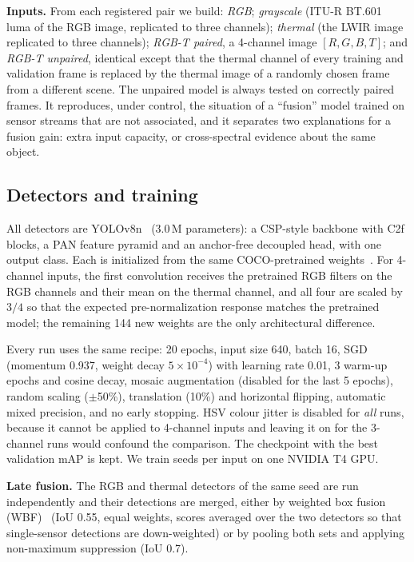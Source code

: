 \documentclass[conference]{IEEEtran}
\begin{document}
\textbf{Inputs.} From each registered pair we build: \emph{RGB}; \emph{grayscale} (ITU-R BT.601 luma of the RGB image, replicated to three channels); \emph{thermal} (the LWIR image replicated to three channels); \emph{RGB-T paired}, a 4-channel image $[R,G,B,T]$; and \emph{RGB-T unpaired}, identical except that the thermal channel of every training and validation frame is replaced by the thermal image of a randomly chosen frame from a different scene. The unpaired model is always tested on correctly paired frames. It reproduces, under control, the situation of a ``fusion'' model trained on sensor streams that are not associated, and it separates two explanations for a fusion gain: extra input capacity, or cross-spectral evidence about the same object.

\subsection{Detectors and training}
All detectors are YOLOv8n~\cite{jocher2023yolov8} (3.0\,M parameters): a CSP-style backbone with C2f blocks, a PAN feature pyramid and an anchor-free decoupled head, with one output class. Each is initialized from the same COCO-pretrained weights~\cite{lin2014coco}. For 4-channel inputs, the first convolution receives the pretrained RGB filters on the RGB channels and their mean on the thermal channel, and all four are scaled by $3/4$ so that the expected pre-normalization response matches the pretrained model; the remaining 144 new weights are the only architectural difference.

Every run uses the same recipe: 20 epochs, input size 640, batch 16, SGD (momentum 0.937, weight decay $5\times10^{-4}$) with learning rate 0.01, 3 warm-up epochs and cosine decay, mosaic augmentation (disabled for the last 5 epochs), random scaling ($\pm$50\%), translation (10\%) and horizontal flipping, automatic mixed precision, and no early stopping. HSV colour jitter is disabled for \emph{all} runs, because it cannot be applied to 4-channel inputs and leaving it on for the 3-channel runs would confound the comparison. The checkpoint with the best validation mAP is kept. We train \NSeeds{} seeds per input on one NVIDIA T4 GPU.

\textbf{Late fusion.} The RGB and thermal detectors of the same seed are run independently and their detections are merged, either by weighted box fusion (WBF)~\cite{solovyev2021wbf} (IoU 0.55, equal weights, scores averaged over the two detectors so that single-sensor detections are down-weighted) or by pooling both sets and applying non-maximum suppression (IoU 0.7).
\end{document}
